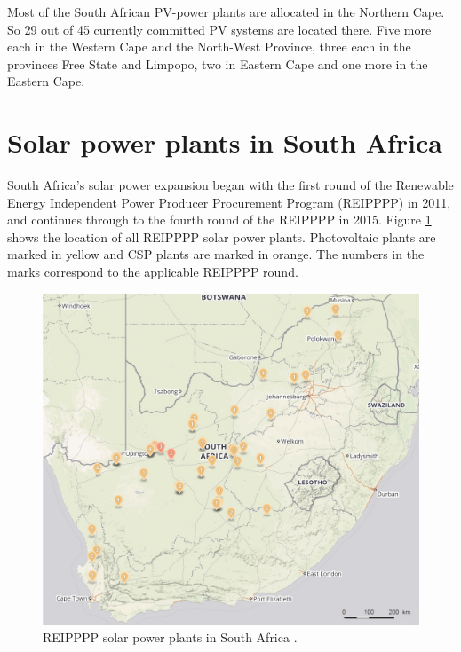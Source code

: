 Most of the South African PV-power plants are allocated in the Northern Cape. So 29 out of 45 currently committed PV systems are located there. Five more each in the Western Cape and the North-West Province, three each in the provinces Free State and Limpopo, two in Eastern Cape and one more in the Eastern Cape. \cite{Forder2015}
\pagebreak
\section{Solar power plants in South Africa}

South Africa's solar power expansion began with the first round of the Renewable Energy Independent Power Producer Procurement Program (REIPPPP) in 2011, and continues through to the fourth round of the REIPPPP in 2015. Figure \ref{Solar-map} shows the location of all REIPPPP solar power plants. Photovoltaic plants are marked in yellow and CSP plants are marked in orange. The numbers in the marks correspond to the applicable REIPPPP round.

\begin{figure}[h!] %
\centering
\includegraphics[width=1\linewidth]{FIG/Solar-map}
\caption[REIPPPP solar power plants in South Africa.]{REIPPPP solar power plants in South Africa \cite{Forder2015}.}\label{Solar-map}
\end{figure}


